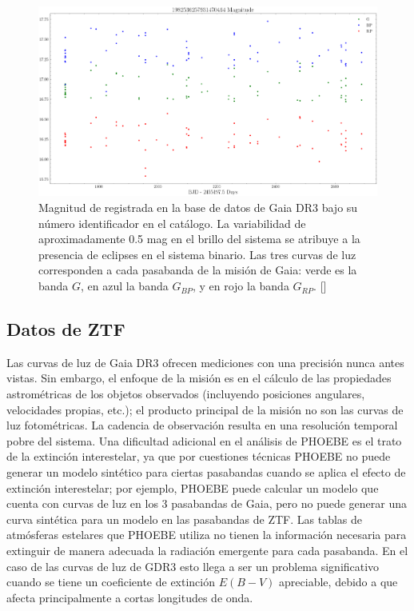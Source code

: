 \begin{figure}[!ht]
	\centering
	\includegraphics[scale=0.38]{Muestra/Secciones/Figures/GDR3-Light-Curves.png}
	\caption{Magnitud de \atoObjId registrada en la base de datos de Gaia DR3
	bajo su número identificador en el catálogo. La variabilidad de
	aproximadamente 0.5 mag en el brillo del sistema se atribuye a la presencia
	de eclipses en el sistema binario. Las tres curvas de luz corresponden a
	cada pasabanda de la misión de Gaia: verde es la banda $G$, en azul la banda
	$G_{BP}$, y en rojo la banda $G_{RP}$.
	[]}
	\label{gdr3AtoObjLightCurves}
\end{figure}

\subsection{Datos de ZTF}

Las curvas de luz de Gaia DR3 ofrecen mediciones con una precisión nunca antes
vistas. Sin embargo, el enfoque de la misión es en el cálculo de las propiedades
astrométricas de los objetos observados (incluyendo posiciones angulares,
velocidades propias, etc.); el producto principal de la misión no son las curvas
de luz fotométricas. La cadencia de observación resulta en una resolución
temporal pobre del sistema. Una dificultad adicional en el análisis de PHOEBE es
el trato de la extinción interestelar, ya que por cuestiones técnicas PHOEBE no
puede generar un modelo sintético para ciertas pasabandas cuando se aplica el
efecto de extinción interestelar; por ejemplo, PHOEBE puede calcular un
modelo que cuenta con curvas de luz en los 3 pasabandas de Gaia, pero no puede
generar una curva sintética para un modelo en las pasabandas de ZTF. Las tablas
de atmósferas estelares que PHOEBE utiliza no tienen la información necesaria
para extinguir de manera adecuada la radiación emergente para cada pasabanda.
En el caso de las curvas de luz de GDR3 esto llega a ser un problema
significativo cuando se tiene un coeficiente de extinción $E(B - V)$ apreciable,
debido a que afecta principalmente a cortas longitudes de onda.

